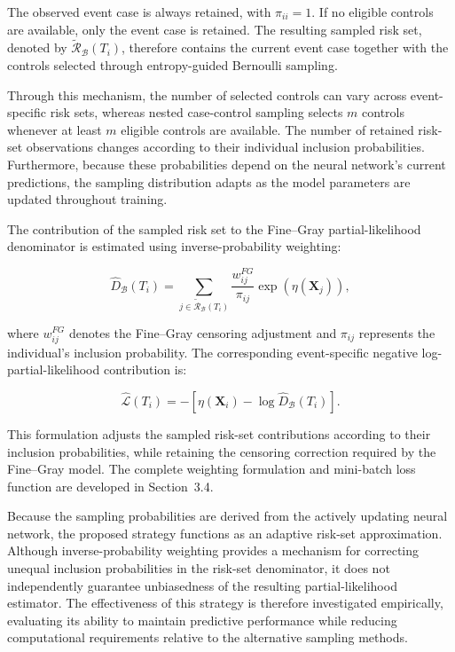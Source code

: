 \documentclass[a4paper,twoside,12pt]{report}
\begin{document}
The observed event case is always retained, with $\pi_{ii}=1$. If no eligible controls are available, only the event case is retained. The resulting sampled risk set, denoted by $\widetilde{\mathcal{R}}_{\mathcal{B}}(T_i)$, therefore contains the current event case together with the controls selected through entropy-guided Bernoulli sampling.

Through this mechanism, the number of selected controls can vary across event-specific risk sets, whereas nested case-control sampling selects $m$ controls whenever at least $m$ eligible controls are available. The number of retained risk-set observations changes according to their individual inclusion probabilities. Furthermore, because these probabilities depend on the neural network's current predictions, the sampling distribution adapts as the model parameters are updated throughout training.

The contribution of the sampled risk set to the Fine--Gray partial-likelihood denominator is estimated using inverse-probability weighting:

\begin{equation}
\widehat{D}_{\mathcal{B}}(T_i)
=
\sum_{j\in\widetilde{\mathcal{R}}_{\mathcal{B}}(T_i)}
\frac{w_{ij}^{FG}}{\pi_{ij}}
\exp\left(\eta(\boldsymbol{X}_j)\right),
\end{equation}

where $w_{ij}^{FG}$ denotes the Fine--Gray censoring adjustment and $\pi_{ij}$ represents the individual's inclusion probability. The corresponding event-specific negative log-partial-likelihood contribution is:

\begin{equation}
\widehat{\mathcal{L}}(T_i)
=
-\left[
\eta(\boldsymbol{X}_i)
-
\log\widehat{D}_{\mathcal{B}}(T_i)
\right].
\end{equation}

This formulation adjusts the sampled risk-set contributions according to their inclusion probabilities, while retaining the censoring correction required by the Fine--Gray model. The complete weighting formulation and mini-batch loss function are developed in Section~3.4.

Because the sampling probabilities are derived from the actively updating neural network, the proposed strategy functions as an adaptive risk-set approximation. Although inverse-probability weighting provides a mechanism for correcting unequal inclusion probabilities in the risk-set denominator, it does not independently guarantee unbiasedness of the resulting partial-likelihood estimator. The effectiveness of this strategy is therefore investigated empirically, evaluating its ability to maintain predictive performance while reducing computational requirements relative to the alternative sampling methods.
\end{document}
